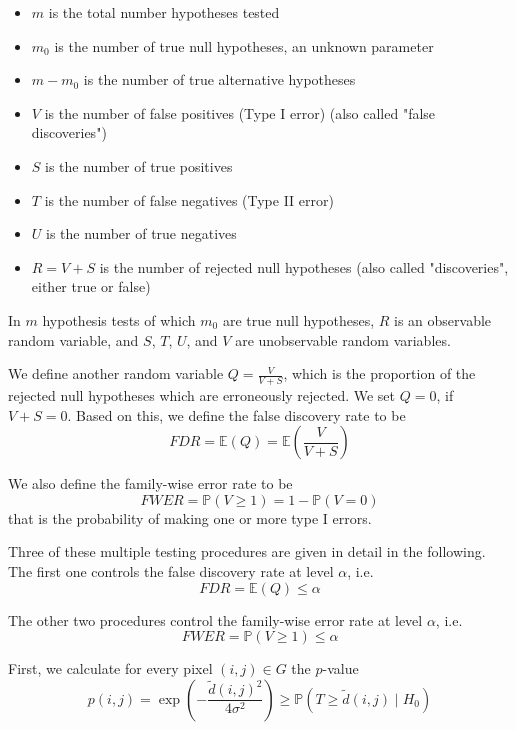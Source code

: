 \documentclass[a4paper,12pt]{article}
\theoremstyle{plain}
\theoremstyle{definition}
\theoremstyle{remark}
\begin{document}
	\begin{itemize}
		\item $m$ is the total number hypotheses tested
		\item $m_0$ is the number of true null hypotheses, an unknown parameter
		\item $m - m_0$ is the number of true alternative hypotheses
		\item $V$ is the number of false positives (Type I error) (also called "false discoveries")
		\item $S$ is the number of true positives
		\item $T$ is the number of false negatives (Type II error)
		\item $U$ is the number of true negatives
		\item $R = V + S$ is the number of rejected null hypotheses (also called "discoveries", either true or false)
	\end{itemize}
	In $m$ hypothesis tests of which $m_0$ are true null hypotheses, $R$ is an observable random variable, and $S$, $T$, $U$, and $V$ are unobservable random variables.
	
	We define another random variable $Q = \frac{V}{V + S}$, which is the proportion of the rejected null hypotheses which are erroneously rejected. We set $Q = 0$, if $V + S = 0$. Based on this, we define the false discovery rate to be
	\begin{equation}
		FDR = \mathbb{E}(Q) = \mathbb{E} \left( \frac{V}{V + S} \right)
	\end{equation}
	
	We also define the family-wise error rate to be
	\begin{equation}
		FWER = \mathbb{P}( V \geq 1 ) = 1 - \mathbb{P}( V = 0 )
	\end{equation}
	that is the probability of making one or more type I errors.
	
	Three of these multiple testing procedures are given in detail in the following. The first one controls the false discovery rate at level $\alpha$, i.e.
	\begin{equation}
		FDR = \mathbb{E}(Q) \leq \alpha
	\end{equation}
	
	The other two procedures control the family-wise error rate at level $\alpha$, i.e.
	\begin{equation}
		FWER = \mathbb{P}( V \geq 1 ) \leq \alpha
	\end{equation}
	
	First, we calculate for every pixel $(i, j) \in G$ the $p$-value
	\begin{equation}
		p(i, j) = \exp \left( - \frac{\tilde{d}(i, j)^2}{4 \sigma^2} \right) \geq \mathbb{P}(T \geq \tilde{d}(i, j) \mid H_0)
	\end{equation}
	
\end{document}
